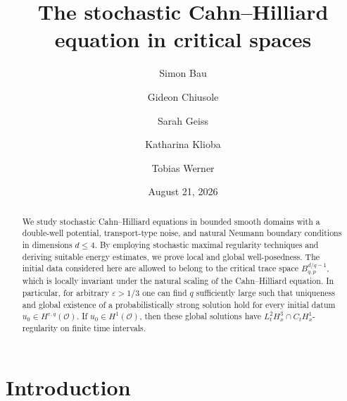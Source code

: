 \documentclass[reqno]{amsart}
\title{The stochastic Cahn--Hilliard equation in critical spaces}
\author{Simon Bau}
\author{Gideon Chiusole}
\author{Sarah Geiss}
\author{Katharina Klioba}
\author{Tobias Werner}
\date{August 21, 2026}
\newcommand{\sO}{\mathscr{O}}
\newcommand{\1}{\mathbf{1}}
\begin{document}
\begin{abstract}
    We study stochastic Cahn--Hilliard equations in bounded smooth domains with a double-well potential, transport-type noise, and natural Neumann boundary conditions in dimensions $d\le 4$. By employing stochastic maximal regularity techniques and deriving suitable energy estimates, we prove local and global well-posedness. The initial data considered here are allowed to belong to the critical trace space $B^{d/q-1}_{q,p}$, which is locally invariant under the natural scaling of the Cahn--Hilliard equation. In particular, for arbitrary $\varepsilon>1/3$ one can find $q$ sufficiently large such that uniqueness and global existence of a probabilistically strong solution hold for every initial datum $u_0\in H^{\varepsilon, q}(\sO)$. If $u_0\in H^{1}(\sO)$, then these global solutions have $L_t^2H_x^3 \cap C_tH_x^1$-regularity on finite time intervals.
\end{abstract}



\maketitle

\tableofcontents

\section{Introduction}
\end{document}
